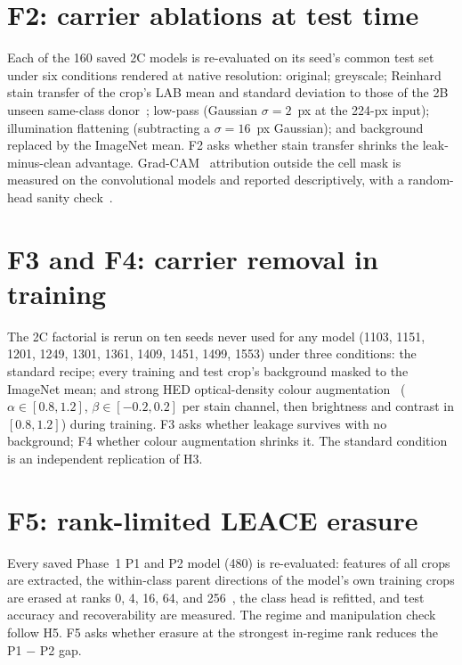 

\section{F2: carrier ablations at test time}

Each of the 160 saved 2C models is re-evaluated on its seed's common test set under six conditions rendered at native
resolution: original; greyscale; Reinhard stain transfer of the crop's LAB mean and standard deviation to those of the 2B
unseen same-class donor~\citep{reinhard2001color}; low-pass (Gaussian $\sigma=2$~px at the 224-px input); illumination
flattening (subtracting a $\sigma=16$~px Gaussian); and background replaced by the ImageNet mean. F2 asks whether stain
transfer shrinks the leak-minus-clean advantage. Grad-CAM~\citep{selvaraju2017gradcam} attribution outside the cell mask is
measured on the convolutional models and reported descriptively, with a random-head sanity check~\citep{adebayo2018sanity}.

\section{F3 and F4: carrier removal in training}

The 2C factorial is rerun on ten seeds never used for any model (1103, 1151, 1201, 1249, 1301, 1361, 1409, 1451, 1499, 1553)
under three conditions: the standard recipe; every training and test crop's background masked to the ImageNet mean; and
strong HED optical-density colour augmentation~\citep{tellez2019quantifying,ruifrok2001color} ($\alpha\in[0.8,1.2]$,
$\beta\in[-0.2,0.2]$ per stain channel, then brightness and contrast in $[0.8,1.2]$) during training. F3 asks whether leakage
survives with no background; F4 whether colour augmentation shrinks it. The standard condition is an independent
replication of H3.

\section{F5: rank-limited LEACE erasure}



Every saved Phase~1 P1 and P2 model (480) is re-evaluated: features of all crops are extracted, the within-class parent
directions of the model's own training crops are erased at ranks 0, 4, 16, 64, and 256~\citep{belrose2023leace}, the class
head is refitted, and test accuracy and recoverability are measured. The regime and manipulation check follow H5. F5 asks
whether erasure at the strongest in-regime rank reduces the P1 $-$ P2 gap.

